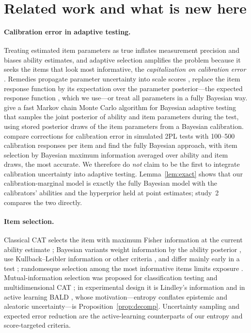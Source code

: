 \section{Related work and what is new here}
\label{sec:related}

\paragraph{Calibration error in adaptive testing.} Treating estimated item parameters
as true inflates measurement precision and biases ability estimates, and adaptive
selection amplifies the problem because it seeks the items that look most informative,
the \emph{capitalization on calibration error}
\citep{vanderlinden2000capitalization,olea2012capitalization,patton2013influence}.
Remedies propagate parameter uncertainty into scale scores
\citep{zhang2011investigating,yang2012characterizing}, replace the item response
function by its expectation over the parameter posterior---the expected response
function \citep{mislevy1994erf}, which we use---or treat all parameters in a fully
Bayesian way. \citet{vanderlinden2020fast} give a fast Markov chain Monte Carlo
algorithm for Bayesian adaptive testing that samples the joint posterior of ability and
item parameters during the test, using stored posterior draws of the item parameters
from a Bayesian calibration. \citet{fink2025accounting} compare corrections for
calibration error in simulated 2PL tests with 100--500 calibration responses per item
and find the fully Bayesian approach, with item selection by Bayesian maximum
information averaged over ability and item draws, the most accurate. We therefore do
\emph{not} claim to be the first to integrate calibration uncertainty into adaptive
testing. Lemma~\ref{lem:exact} shows that our calibration-marginal model is exactly
the fully Bayesian model with the calibrators' abilities and the hyperprior held at point
estimates; study~2 compares the two directly.

\paragraph{Item selection.} Classical CAT selects the item with maximum Fisher
information at the current ability estimate \citep{lord1980applications}; Bayesian
variants weight information by the ability posterior
\citep{owen1975bayesian,vanderlinden1998bayesian}, use Kullback--Leibler information
\citep{chang1996global} or other criteria \citep{veerkamp1997some}, and differ mainly
early in a test \citep{chen2000comparison}; randomesque selection among the most
informative items limits exposure \citep{kingsbury1989procedures}. Mutual-information
selection was proposed for classification testing \citep{weissman2007mutual} and
multidimensional CAT \citep{wang2011item}; in experimental design it is Lindley's
information \citep{lindley1956measure,chaloner1995bayesian,rainforth2024modern} and in
active learning BALD \citep{houlsby2011bald}, whose motivation---entropy conflates
epistemic and aleatoric uncertainty---is Proposition~\ref{prop:decomp}. Uncertainty
sampling \citep{lewis1994sequential} and expected error reduction
\citep{roy2001toward} are the active-learning counterparts of our entropy and
score-targeted criteria.

